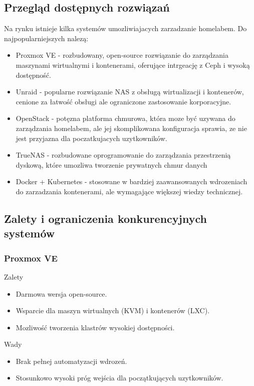 \subsection{Przegląd dostępnych rozwiązań}
Na rynku istnieje kilka systemów umozliwiajacych zarzadzanie homelabem. Do najpopularniejszych nalezą:
\begin{itemize}
    \item Proxmox VE - rozbudowany, open-source rozwiązanie do zarządzania maszynami wirtualnymi i kontenerami, oferujące intrgeację z Ceph i wysoką dostępność.
    \item Unraid - popularne rozwiązanie NAS z obsługą wirtualizacji i kontenerów, cenione za łatwość obsługi ale ograniczone zastosowanie korporacyjne.
    \item OpenStack - potęzna platforma chmurowa, która moze być uzywana do zarządzania homelabem, ale jej skomplikowana konfiguracja sprawia, ze nie jest przyjazna dla poczatkujacych uzytkowników.
    \item TrueNAS - rozbudowane oprogramowanie do zarządzania przestrzenią dyskową, które umozliwa tworzenie prywatnych chmur danych
    \item Docker + Kubernetes - stosowane w bardziej zaawansowanych wdrozeniach do zarzadzania kontenerami, ale wymagające większej wiedzy technicznej.
\end{itemize}
\subsection{Zalety i ograniczenia konkurencyjnych systemów}

\subsubsection{Proxmox VE}
\begin{minipage}{0.45\textwidth}
    Zalety
    \begin{itemize}
        \item Darmowa wersja open-source.
        \item Wsparcie dla maszyn wirtualnych (KVM) i kontenerów (LXC).
        \item Mozliwość tworzenia klastrów wysokiej dostępności.
    \end{itemize}
\end{minipage}\hfil
\begin{minipage}{0.45\textwidth}
    Wady
    \begin{itemize}
        \item Brak pełnej automatyzacji wdrozeń.
        \item Stosunkowo wysoki próg wejścia dla początkujących uzytkowników.
    \end{itemize}
\end{minipage}

